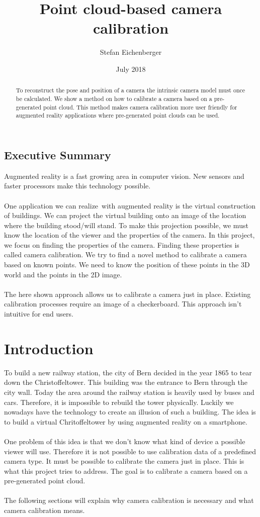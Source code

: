 \documentclass[11pt,a4paper,titlepage,oneside]{report}
\title{Point cloud-based camera calibration}
\author{Stefan Eichenberger}
\date{July 2018}
\begin{document}
\maketitle

\begin{abstract}
To reconstruct the pose and position of a camera the intrinsic camera model must once be calculated. We show a method on how to calibrate a camera based on a pre-generated point cloud. This method makes camera calibration more user friendly for augmented reality applications where pre-generated point clouds can be used.
\end{abstract}

\section*{Executive Summary}
Augmented reality is a fast growing area in computer vision. New sensors and faster processors make this technology possible.\\\\
One application we can realize with augmented reality is the virtual construction of buildings. We can project the virtual building onto an image of the location where the building stood/will stand. To make this projection possible, we must know the location of the viewer and the properties of the camera. In this project, we focus on finding the properties of the camera. Finding these properties is called camera calibration. We try to find a novel method to calibrate a camera based on known points. We need to know the position of these points in the 3D world and the points in the 2D image.\\\\
The here shown approach allows us to calibrate a camera just in place. Existing calibration processes require an image of a checkerboard. This approach isn't intuitive for end users.

\tableofcontents

\chapter{Introduction}
To build a new railway station, the city of Bern decided in the year 1865 to tear down the Christoffeltower. This building was the entrance to Bern through the city wall. Today the area around the railway station is heavily used by buses and cars. Therefore, it is impossible to rebuild the tower physically. Luckily we nowadays have the technology to create an illusion of such a building. The idea is to build a virtual Chritoffeltower by using augmented reality on a smartphone.\\\\
One problem of this idea is that we don't know what kind of device a possible viewer will use. Therefore it is not possible to use calibration data of a predefined camera type. It must be possible to calibrate the camera just in place. This is what this project tries to address. The goal is to calibrate a camera based on a pre-generated point cloud.\\\\
The following sections will explain why camera calibration is necessary and what camera calibration means.
\end{document}
